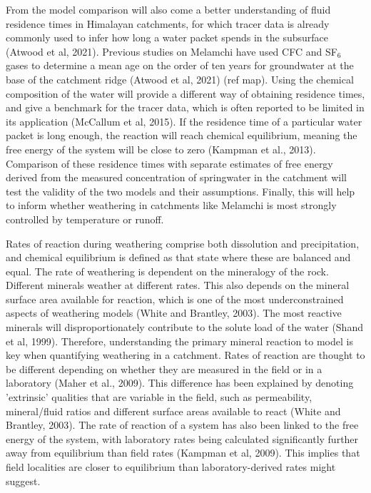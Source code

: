 \bsk

From the model comparison will also come a better understanding of fluid residence times in Himalayan catchments, for which tracer data is already commonly used to infer how long a water packet spends in the subsurface (Atwood et al, 2021). Previous studies on Melamchi have used CFC and SF$_6$ gases to determine a mean age on the order of ten years for groundwater at the base of the catchment ridge (Atwood et al, 2021) (ref map). Using the chemical composition of the water will provide a different way of obtaining residence times, and give a benchmark for the tracer data, which is often reported to be limited in its application (McCallum et al, 2015). If the residence time of a particular water packet is long enough, the reaction will reach chemical equilibrium, meaning the free energy of the system will be close to zero (Kampman et al., 2013). Comparison of these residence times with separate estimates of free energy derived from the measured concentration of springwater in the catchment will test the validity of the two models and their assumptions. Finally, this will help to inform whether weathering in catchments like Melamchi is most strongly controlled by temperature or runoff.

\bsk

Rates of reaction during weathering comprise both dissolution and precipitation, and chemical equilibrium is defined as that state where these are balanced and equal. The rate of weathering is dependent on the mineralogy of the rock. Different minerals weather at different rates. This also depends on the mineral surface area available for reaction, which is one of the most underconstrained aspects of weathering models (White and Brantley, 2003). The most reactive minerals will disproportionately contribute to the solute load of the water (Shand et al, 1999). Therefore, understanding the primary mineral reaction to model is key when quantifying weathering in a catchment. Rates of reaction are thought to be different depending on whether they are measured in the field or in a laboratory (Maher et al., 2009). This difference has been explained by denoting 'extrinsic' qualities that are variable in the field, such as permeability, mineral/fluid ratios and different surface areas available to react (White and Brantley, 2003). The rate of reaction of a system has also been linked to the free energy of the system, with laboratory rates being calculated significantly further away from equilibrium than field rates (Kampman et al, 2009). This implies that field localities are closer to equilibrium than laboratory-derived rates might suggest. 

